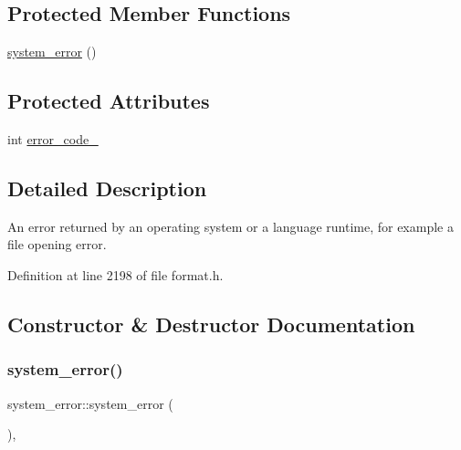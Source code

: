 \subsection*{Protected Member Functions}
\begin{DoxyCompactItemize}
\item 
\hyperlink{classsystem__error_a0a883f3911253771f2e8fea883ccb21d}{system\+\_\+error} ()
\end{DoxyCompactItemize}
\subsection*{Protected Attributes}
\begin{DoxyCompactItemize}
\item 
int \hyperlink{classsystem__error_a35ed90a7a994961cdb27b5a004b0e9de}{error\+\_\+code\+\_\+}
\end{DoxyCompactItemize}


\subsection{Detailed Description}
An error returned by an operating system or a language runtime, for example a file opening error. 

Definition at line 2198 of file format.\+h.



\subsection{Constructor \& Destructor Documentation}
\mbox{\label{classsystem__error_a0a883f3911253771f2e8fea883ccb21d}} 
\subsubsection{\texorpdfstring{system\+\_\+error()}{system\_error()}\hspace{0.1cm}{\footnotesize\ttfamily [1/2]}}
{\footnotesize\ttfamily system\+\_\+error\+::system\+\_\+error (\begin{DoxyParamCaption}{ }\end{DoxyParamCaption})\hspace{0.3cm}{\ttfamily [inline]}, {\ttfamily [protected]}}



